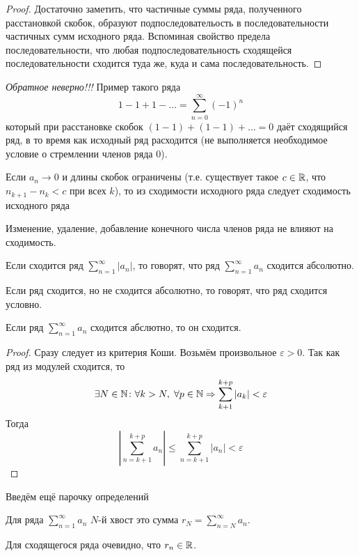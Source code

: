 \documentclass[a4paper, 12pt]{article}
\begin{document}
\begin{proof}
	Достаточно заметить, что частичные суммы ряда, полученного расстановкой скобок, образуют подпоследовательость в последовательности частичных сумм исходного ряда. Вспоминая свойство предела последовательности, что любая подпоследовательность сходящейся последовательности сходится туда же, куда и сама последовательность.
\end{proof}
\emph{Обратное неверно!!!} Пример такого ряда 
$$
1 - 1 + 1 - \ldots = \sum\limits_{n = 0}^{\infty} \left(-1\right)^n
$$
который при расстановке скобок $(1 - 1) + (1 - 1) + \ldots = 0$ даёт сходящийся ряд, в то время как исходный ряд расходится (не выполняется необходимое условие о стремлении членов ряда 0). 
\begin{Statement}
	Если $a_n \to 0$ и длины скобок ограничены (т.е. существует такое $c \in \mathbb{R}$, что $n_{k+1} - n_{k} < c$ при всех $k$), то из сходимости исходного ряда следует сходимость исходного ряда
\end{Statement}
\begin{Statement}
	Изменение, удаление, добавление конечного числа членов ряда не влияют на сходимость.
\end{Statement}
\begin{Def}
	Если сходится ряд $\sum\limits_{n = 1}^{\infty}|a_n|$, то говорят, что ряд $\sum\limits_{n = 1}^{\infty}a_n$ сходится абсолютно.
\end{Def}
\begin{Def}
	Если ряд сходится, но не сходится абсолютно, то говорят, что ряд сходится условно.
\end{Def}
\begin{Statement}
	Если ряд $\sum\limits_{n=1}^{\infty}a_n$ сходится абслютно, то он сходится.
\end{Statement}
\begin{proof}
	Сразу следует из критерия Коши. Возьмём произвольное $\varepsilon>0$. Так как ряд из модулей сходится, то $$\exists N\in \mathbb{N}\colon \forall k>N,\; \forall p\in \mathbb{N} \Rightarrow \sum\limits_{k+1}^{k+p}|a_k| < \varepsilon$$
	Тогда $$\left| \sum\limits_{n=k+1}^{k+p}a_n\right| \leqslant \sum\limits_{n=k+1}^{k+p}|a_n| < \varepsilon$$
\end{proof}
Введём ещё парочку определений
\begin{Def}
	Для ряда $\sum \limits_{n=1}^{\infty}a_n$ $N$-й хвост это сумма $r_N = \sum \limits_{n=N}^{\infty}a_n$.
\end{Def}
Для сходящегося ряда очевидно, что $r_n \in \mathbb{R}$.
\end{document}
